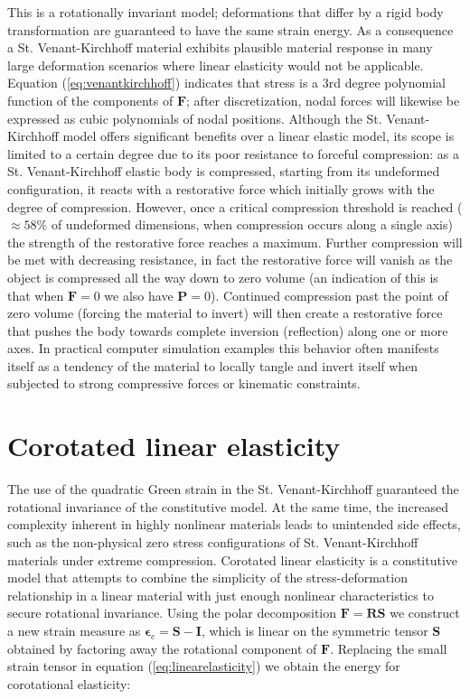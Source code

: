 This is a rotationally invariant model; deformations that differ by a rigid body transformation are guaranteed to have the same strain energy. As a 
consequence a St. Venant-Kirchhoff material exhibits plausible material response in many large deformation scenarios where linear elasticity would 
not be applicable. Equation (\ref{eq:venantkirchhoff}) indicates that stress is a 3rd degree polynomial function of the components of $\boldsymbol{F}$; 
after discretization, nodal forces will likewise be expressed as cubic polynomials of nodal positions.
Although the St. Venant-Kirchhoff model offers significant benefits over a linear elastic model, its scope is limited to a certain degree due to its 
poor resistance to forceful compression: as a St. Venant-Kirchhoff elastic body is compressed, starting from its undeformed configuration, it reacts 
with a restorative force which initially grows with the degree of compression. However, once a critical compression threshold is reached 
($\approx 58\%$ of undeformed dimensions, when compression occurs along a single axis) the strength of the restorative force reaches a maximum. Further
compression will be met with decreasing resistance, in fact the restorative force will vanish as the object is compressed all the way down to zero volume 
(an indication of this is that when $\boldsymbol{F} = 0$ we also have $\boldsymbol{P} = 0$). Continued compression past the point of zero volume (forcing the material to invert) will 
then create a restorative force that pushes the body towards complete inversion (reflection) along one or more axes. In practical computer simulation 
examples this behavior often manifests itself as a tendency of the material to locally tangle and invert itself when subjected to strong compressive forces 
or kinematic constraints.

 
\section{Corotated linear elasticity}
The use of the quadratic Green strain in the St. Venant-Kirchhoff guaranteed the rotational invariance of the constitutive model. At the same time, 
the increased complexity inherent in highly nonlinear materials leads to unintended side effects, such as the non-physical zero stress configurations 
of St. Venant-Kirchhoff materials under extreme compression. Corotated linear elasticity is a constitutive model that attempts to combine the simplicity 
of the stress-deformation relationship in a linear material with just enough nonlinear characteristics to secure rotational invariance.
Using the polar decomposition $\boldsymbol{F} = \boldsymbol{R}\boldsymbol{S}$ we construct a new strain measure as
$\boldsymbol{\epsilon}_c = \boldsymbol{S} − \boldsymbol{I}$, which is linear on the symmetric tensor $\boldsymbol{S}$ obtained by factoring away
the rotational component of $\boldsymbol{F}$. Replacing the small strain tensor in equation (\ref{eq:linearelasticity}) we obtain the energy for corotational 
elasticity:

